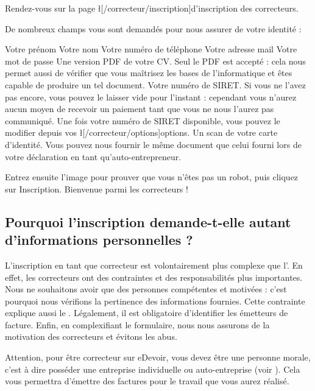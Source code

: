 ﻿Rendez-vous sur la page \l[/correcteur/inscription]{d'inscription des correcteurs}.

De nombreux champs vous sont demandés pour nous assurer de votre identité :
\begin{itemize}
\li Votre prénom
\li Votre nom
\li Votre numéro de téléphone
\li Votre adresse mail
\li Votre mot de passe
\li Une version PDF de votre CV.  Seul le PDF est accepté : cela nous permet aussi de vérifier que vous maîtrisez les bases de l'informatique et êtes capable de produire un tel document.
\li Votre numéro de SIRET.  Si vous ne l'avez pas encore, vous pouvez le laisser vide pour l'instant : cependant vous n'aurez aucun moyen de recevoir un paiement tant que vous ne nous l'aurez pas communiqué. Une fois votre numéro de SIRET disponible, vous pouvez le modifier depuis vos \l[/correcteur/options]{options}.
\li Un scan de votre carte d'identité. Vous pouvez nous fournir le même document que celui fourni lors de votre déclaration en tant qu'auto-entrepreneur.
\end{itemize}

Entrez ensuite l'image pour prouver que vous n'êtes pas un robot, puis cliquez sur Inscription. Bienvenue parmi les correcteurs !

\subsection{Pourquoi l'inscription demande-t-elle autant d'informations personnelles ?}
L'inscription en tant que correcteur est volontairement plus complexe que l'. En effet, les correcteurs ont des contraintes et des responsabilités plus importantes. Nous ne souhaitons avoir que des personnes compétentes et motivées : c'est pourquoi nous vérifions la pertinence des informations fournies. Cette contrainte explique aussi le .
Légalement, il est obligatoire d'identifier les émetteurs de facture.
Enfin, en complexifiant le formulaire, nous nous assurons de la motivation des correcteurs et évitons les abus.

Attention, pour être correcteur sur eDevoir, vous devez être une personne morale, c'est à dire posséder une entreprise individuelle ou auto-entreprise (voir ). Cela vous permettra d'émettre des factures pour le travail que vous aurez réalisé.